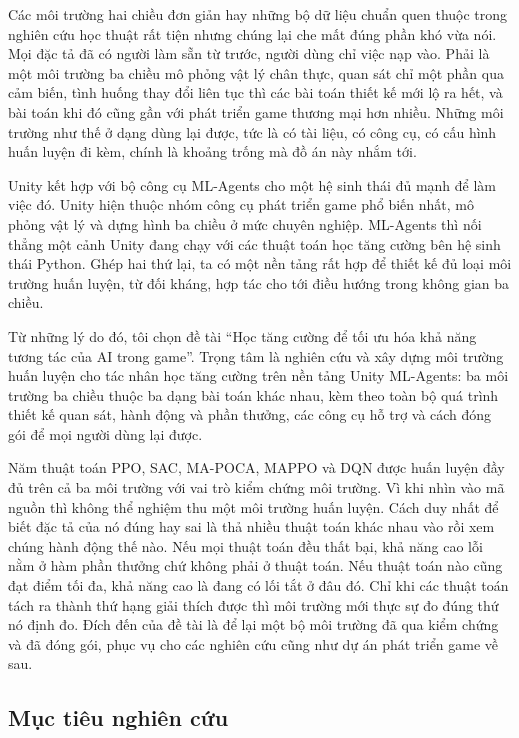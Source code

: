 \indent Các môi trường hai chiều đơn giản hay những bộ dữ liệu chuẩn quen thuộc trong
nghiên cứu học thuật rất tiện nhưng chúng lại che mất đúng phần khó vừa nói. Mọi đặc tả
đã có người làm sẵn từ trước, người dùng chỉ việc nạp vào. Phải là một môi trường ba
chiều mô phỏng vật lý chân thực, quan sát chỉ một phần qua cảm biến, tình huống thay
đổi liên tục thì các bài toán thiết kế mới lộ ra hết, và bài toán khi đó cũng gần với
phát triển game thương mại hơn nhiều. Những môi trường như thế ở dạng dùng lại được,
tức là có tài liệu, có công cụ, có cấu hình huấn luyện đi kèm, chính là khoảng trống mà đồ án này nhắm tới.

\indent Unity kết hợp với bộ công cụ ML-Agents cho một hệ sinh thái đủ mạnh để làm việc
đó. Unity hiện thuộc nhóm công cụ phát triển game phổ biến nhất, mô phỏng vật lý và dựng
hình ba chiều ở mức chuyên nghiệp. ML-Agents thì nối thẳng một cảnh Unity đang chạy với
các thuật toán học tăng cường bên hệ sinh thái Python. Ghép hai thứ lại, ta có một nền
tảng rất hợp để thiết kế đủ loại môi trường huấn luyện, từ đối kháng, hợp tác cho tới
điều hướng trong không gian ba chiều.

\indent Từ những lý do đó, tôi chọn đề tài ``Học tăng cường để tối ưu hóa khả năng tương
tác của AI trong game''. Trọng tâm là nghiên cứu và xây dựng môi trường
huấn luyện cho tác nhân học tăng cường trên nền tảng Unity ML-Agents: ba môi trường ba
chiều thuộc ba dạng bài toán khác nhau, kèm theo toàn bộ quá trình thiết kế quan sát, hành
động và phần thưởng, các công cụ hỗ trợ và cách đóng gói để mọi người dùng lại được.

\indent Năm thuật toán PPO, SAC, MA-POCA, MAPPO và DQN được huấn luyện đầy đủ trên
cả ba môi trường với vai trò kiểm chứng môi trường. Vì khi nhìn vào mã nguồn thì không thể nghiệm thu
một môi trường huấn luyện. Cách duy nhất để biết đặc tả của nó đúng hay sai là thả nhiều
thuật toán khác nhau vào rồi xem chúng hành động thế nào. Nếu mọi thuật toán đều thất bại,
khả năng cao lỗi nằm ở hàm phần thưởng chứ không phải ở thuật toán. Nếu thuật toán nào
cũng đạt điểm tối đa, khả năng cao là đang có lối tắt ở đâu đó. Chỉ khi các thuật toán
tách ra thành thứ hạng giải thích được thì môi trường mới thực sự đo đúng thứ nó định
đo. Đích đến của đề tài là để lại một bộ môi trường đã qua kiểm chứng và đã
đóng gói, phục vụ cho các nghiên cứu cũng như dự án phát triển game về sau.

\subsection{Mục tiêu nghiên cứu}

